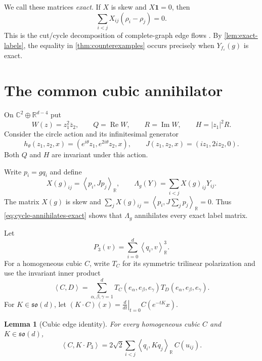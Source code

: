 \documentclass[11pt,reqno]{amsart}
\newtheorem{lemma}[theorem]{Lemma}
\theoremstyle{remark}
\newcommand{\R}{\mathbb R}
\newcommand{\C}{\mathbb C}
\newcommand{\one}{\mathbf 1}
\newcommand{\eps}{\varepsilon}
\newcommand{\ip}[2]{\left\langle #1,#2\right\rangle}
\newcommand{\abs}[1]{\left\lvert #1\right\rvert}
\begin{document}
We call these matrices \emph{exact}.  If $X$ is skew and $X\one=0$, then
\begin{equation}\label{eq:cycle-annihilates-exact}
 \sum_{i<j}X_{ij}(\rho_i-\rho_j)=0.
\end{equation}
This is the cut/cycle decomposition of complete-graph edge flows
\cite{JiangLimYaoYe2011}.  By \cref{lem:exact-labels}, the equality in
\cref{thm:counterexamples} occurs precisely when $Y_{f_\eps}(g)$ is exact.

\section{The common cubic annihilator}\label{sec:cubic-annihilator}

On $\C^2\oplus\R^{d-4}$ put
\begin{equation}\label{eq:WQRH}
 W(z)=z_1^2\overline z_2,
 \qquad Q=\operatorname{Re}W,
 \qquad R=\operatorname{Im}W,
 \qquad H=\abs{z_1}^2R.
\end{equation}
Consider the circle action and its infinitesimal generator
\begin{equation}\label{eq:circle-action}
 h_\theta(z_1,z_2,x)=(e^{i\theta}z_1,e^{2i\theta}z_2,x),
 \qquad J(z_1,z_2,x)=(iz_1,2iz_2,0).
\end{equation}
Both $Q$ and $H$ are invariant under this action.

Write $p_i=gq_i$ and define
\begin{equation}\label{eq:X-Lambda}
 X(g)_{ij}=\ip{p_i}{Jp_j}_{\R},
 \qquad
 \Lambda_g(Y)=\sum_{i<j}X(g)_{ij}Y_{ij}.
\end{equation}
The matrix $X(g)$ is skew and
$\sum_jX(g)_{ij}=\ip{p_i}{J\sum_jp_j}_{\R}=0$.  Thus
\eqref{eq:cycle-annihilates-exact} shows that $\Lambda_g$ annihilates every
exact label matrix.

Let
\[
 P_3(v)=\sum_{i=0}^{d}\ip{q_i}{v}_{\R}^{3}.
\]
For a homogeneous cubic $C$, write $T_C$ for its symmetric trilinear
polarization and use the invariant inner product
\[
 \ip{C}{D}=\sum_{\alpha,\beta,\gamma=1}^{d}
 T_C(e_\alpha,e_\beta,e_\gamma)
 T_D(e_\alpha,e_\beta,e_\gamma).
\]
For $K\in\mathfrak{so}(d)$, let
$(K\cdot C)(x)=\left.\frac{d}{dt}\right|_{t=0}C(e^{-tK}x)$.

\begin{lemma}[Cubic edge identity]\label{lem:cubic-edge-identity}
For every homogeneous cubic $C$ and $K\in\mathfrak{so}(d)$,
\begin{equation}\label{eq:cubic-edge-identity}
 \ip{C}{K\cdot P_3}
 =2\sqrt2\sum_{i<j}\ip{q_i}{Kq_j}_{\R}\,C(u_{ij}).
\end{equation}
\end{lemma}
\end{document}

